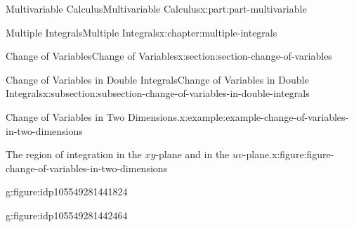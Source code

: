 \documentclass[twoside,10pt,]{book}
\numberwithin{equation}{part}
\begin{document}
\begin{partptx}{Multivariable Calculus}{}{Multivariable Calculus}{}{}{x:part:part-multivariable}
\begin{chapterptx}{Multiple Integrals}{}{Multiple Integrals}{}{}{x:chapter:multiple-integrals}
\begin{sectionptx}{Change of Variables}{}{Change of Variables}{}{}{x:section:section-change-of-variables}
\begin{subsectionptx}{Change of Variables in Double Integrals}{}{Change of Variables in Double Integrals}{}{}{x:subsection:subsection-change-of-variables-in-double-integrals}
\begin{example}{Change of Variables in Two Dimensions.}{x:example:example-change-of-variables-in-two-dimensions}
\begin{figureptx}{The region of integration in the \(xy\)-plane and in the \(uv\)-plane.}{x:figure:figure-change-of-variables-in-two-dimensions}{}
\begin{sidebyside}{2}{0}{0}{0}
\begin{sbspanel}{0.5}
\begin{subfigureptx}{}{g:figure:idp105549281441824}{}
{
}%
\tcblower
\end{subfigureptx}%
\end{sbspanel}%
\begin{sbspanel}{0.5}%
\begin{subfigureptx}{}{g:figure:idp105549281442464}{}%
\end{subfigureptx}
\end{sbspanel}
\end{sidebyside}
\end{figureptx}
\end{example}
\end{subsectionptx}
\end{sectionptx}
\end{chapterptx}
\end{partptx}
\end{document}
